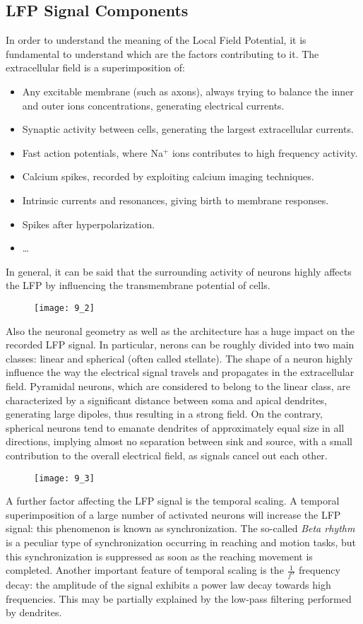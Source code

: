 \subsection{LFP Signal Components}
In order to understand the meaning of the Local Field Potential, it is fundamental to
understand which are the factors contributing to it. The extracellular field is
a superimposition of:
\begin{itemize}
    \item Any excitable membrane (such as axons), always trying to balance the inner
    and outer ions concentrations, generating electrical currents.
    \item Synaptic activity between cells, generating the largest extracellular
    currents.
    \item Fast action potentials, where Na\({}^+\) ions contributes to high frequency
    activity.
    \item Calcium spikes, recorded by exploiting calcium imaging techniques.
    \item Intrinsic currents and resonances, giving birth to membrane responses.
    \item Spikes after hyperpolarization.
    \item \dots
\end{itemize}
In general, it can be said that the surrounding activity of neurons highly affects the
LFP by influencing the transmembrane potential of cells.
\begin{figure}[H]
    \texttt{[image: 9\_2]}
    \centering
\end{figure}
Also the neuronal geometry as well as the architecture has a huge impact on the
recorded LFP signal. In particular, nerons can be roughly divided into two main
classes: linear and spherical (often called stellate). The shape of a neuron highly
influence the way the electrical signal travels and propagates in the extracellular
field. Pyramidal neurons, which are considered to belong to the linear class, are
characterized by a significant distance between soma and apical dendrites, generating
large dipoles, thus resulting in a strong field. On the contrary, spherical neurons
tend to emanate dendrites of approximately equal size in all directions, implying
almost no separation between sink and source, with a small contribution to the overall
electrical field, as signals cancel out each other.
\begin{figure}[H]
    \texttt{[image: 9\_3]}
    \centering
\end{figure}
A further factor affecting the LFP signal is the temporal scaling. A temporal
superimposition of a large number of activated neurons will increase the LFP
signal: this phenomenon is known as synchronization. The so-called \textit{Beta rhythm}
is a peculiar type of synchronization occurring in reaching and motion tasks, but this
synchronization is suppressed as soon as the reaching movement is completed. Another
important feature of temporal scaling is the \(\frac{1}{f^{\alpha}}\) frequency decay:
the amplitude of the signal exhibits a power law decay towards high frequencies. This
may be partially explained by the low-pass filtering performed by dendrites.

